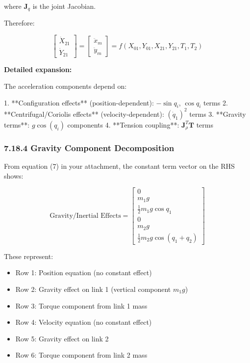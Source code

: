 where $\mathbf{J}_q$ is the joint Jacobian.

Therefore:

\begin{equation}
\begin{bmatrix}
\dot{X}_{21} \\
\dot{Y}_{21}
\end{bmatrix} = \begin{bmatrix}
\ddot{x}_m \\
\ddot{y}_m
\end{bmatrix} = f(X_{01}, Y_{01}, X_{21}, Y_{21}, T_1, T_2)
\end{equation}

\textbf{Detailed expansion:}

The acceleration components depend on:

1. **Configuration effects** (position-dependent): $-\sin q_i$, $\cos q_i$ terms
2. **Centrifugal/Coriolis effects** (velocity-dependent): $(\dot{q}_1)^2$ terms
3. **Gravity terms**: $g \cos(q_i)$ components
4. **Tension coupling**: $\mathbf{J}_{\rho}^T \mathbf{T}$ terms

\subsubsection{7.18.4 Gravity Component Decomposition}

From equation (7) in your attachment, the constant term vector on the RHS shows:

\begin{equation}
\text{Gravity/Inertial Effects} = \begin{bmatrix}
0 \\
m_1 g \\
\frac{1}{2} m_1 g \cos q_1 \\
0 \\
m_2 g \\
\frac{1}{2} m_2 g \cos(q_1 + q_2)
\end{bmatrix}
\end{equation}

These represent:
\begin{itemize}
    \item Row 1: Position equation (no constant effect)
    \item Row 2: Gravity effect on link 1 (vertical component $m_1 g$)
    \item Row 3: Torque component from link 1 mass
    \item Row 4: Velocity equation (no constant effect)
    \item Row 5: Gravity effect on link 2
    \item Row 6: Torque component from link 2 mass
\end{itemize}

